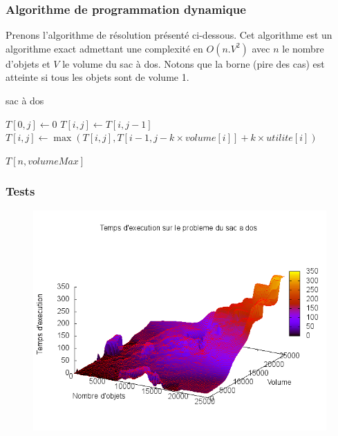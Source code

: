 \subsubsection{Algorithme de programmation dynamique}
Prenons l'algorithme de résolution présenté ci-dessous. Cet algorithme est un algorithme exact admettant une complexité en $O(n.V^2)$ avec $n$ le nombre d'objets et $V$ le volume du sac à dos. Notons que la borne (pire des cas) est atteinte si tous les objets sont de volume 1.
\begin{algorithm}[H]
	\caption{sac à dos}
	\begin{algorithmic}[1]
				\STATE $T[0, j] \leftarrow 0$
		\ENDFOR
					\STATE $T[i, j] \leftarrow T[i, j-1]$
				\ENDIF
					\STATE $T[i,j] \leftarrow \max(T[i,j], T[i-1,j-k \times volume[i]] + k \times utilite[i])$
				\ENDFOR
			\ENDFOR
		\ENDFOR
	
	\RETURN $T[n,volumeMax]$
	\end{algorithmic}
\end{algorithm}


\subsubsection{Tests}

\begin{figure}[H]
	\includegraphics[width=\linewidth]{../pratique/prog_dynamique_dev/res/bag.png}
\end{figure}


